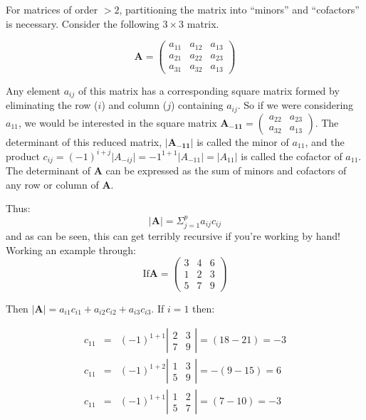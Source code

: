 For matrices of order $>2$, partitioning the matrix into ``minors'' and ``cofactors'' is necessary.   Consider the following $3 \times 3$ matrix.

\begin{displaymath}
\boldsymbol{A} = \left( \begin{array}{rrr} a_{11} & a_{12} & a_{13} \\
 a_{21} & a_{22} & a_{23} \\
 a_{31} & a_{32} & a_{13} \end{array} \right)
\end{displaymath}

Any element $a_{ij}$ of this matrix has a corresponding square matrix formed by eliminating the row ($i$) and column ($j$) containing $a_{ij}$.   So if we were considering $a_{11}$, we would be interested in the square matrix $\boldsymbol{A_{-11}} =  \left( \begin{array}{rr} 
 a_{22} & a_{23} \\
 a_{32} & a_{13} \end{array} \right)$.   The determinant of this reduced matrix, $\lvert \boldsymbol{A_{-11}} \rvert$ is called the minor of $a_{11}$, and the product $c_{ij} = (-1)^{i+j}\lvert A_{-ij} \rvert = -1^{1+1} \lvert A_{-11}\rvert = \lvert A_{11} \rvert$ is called the cofactor of $a_{11}$.   The determinant of $\boldsymbol{A}$ can be expressed as the sum of minors and cofactors of any row or column of $\boldsymbol{A}$.

Thus:
\begin{displaymath}
\lvert \boldsymbol{A} \rvert = \Sigma_{j = 1}^{p} a_{ij} c_{ij}
\end{displaymath}
and as can be seen, this can get terribly recursive if you're working by hand!   Working an example through:
\begin{displaymath}
\mbox{If} \boldsymbol{A} = \left( \begin{array}{rrr} 3 & 4 & 6 \\
 1 & 2 & 3 \\
 5 & 7 & 9 \end{array} \right)
\end{displaymath}

Then $\lvert \boldsymbol{A} \lvert = a_{i1}c_{i1} +  a_{i2}c_{i2} +  a_{i3}c_{i3}$.   If $i=1$ then:

\begin{eqnarray*}
c_{11} &=& (-1)^{1+1} \left| \begin{array}{rr} 2 & 3 \\7 & 9 \end{array} \right| = (18-21) = -3\\ 
c_{11} &=& (-1)^{1+2} \left| \begin{array}{rr} 1 & 3 \\5 & 9 \end{array} \right| = -(9-15) = 6\\
c_{11} &=& (-1)^{1+1} \left| \begin{array}{rr} 1 & 2 \\5 & 7 \end{array} \right| = (7-10) = -3
\end{eqnarray*}

